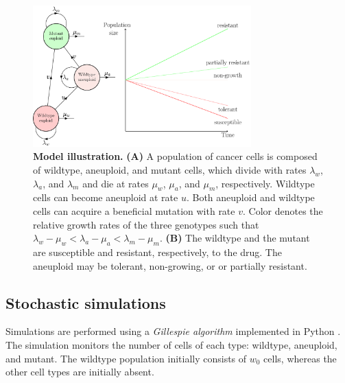 \documentclass[12pt]{extarticle}
\begin{document}
\begin{figure}[!t]
\centering
\includegraphics[width=0.75\textwidth]{Figures/figureAneuploidy.pdf}
\caption{
\textbf{Model illustration.}
\textbf{(A)} A population of cancer cells is composed of wildtype, aneuploid, and mutant cells, which divide with rates $\lambda_w$, $\lambda_a$, and $\lambda_m$ and die at rates $\mu_w$, $\mu_a$, and $\mu_m$, respectively. 
Wildtype cells can become aneuploid at rate $u$. Both aneuploid and wildtype cells can acquire a beneficial mutation with rate $v$. Color denotes the relative growth rates of the three genotypes such that $\lambda_w - \mu_w < \lambda_a - \mu_a < \lambda_m - \mu_m$. \textbf{(B)} The wildtype and the mutant are susceptible and resistant, respectively, to the drug. The aneuploid may be tolerant, non-growing, or or partially resistant.
}
\label{figureAneuploidy}
\end{figure}


\subsection*{Stochastic simulations} 
Simulations are performed using a \emph{Gillespie algorithm} \citep{gillespie1976general,gillespie1977exact} implemented in Python \citep{python}.
The simulation monitors the number of cells of each type: wildtype, aneuploid, and mutant. 
The wildtype population initially consists of $w_0$ cells, whereas the other cell types are initially absent.
\end{document}
